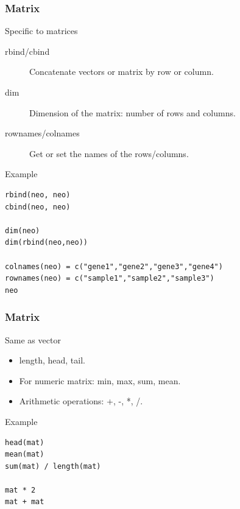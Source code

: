 \documentclass[10pt]{beamer}
\newenvironment{xframe}[2][]
  {\begin{frame}[fragile,environment=xframe,#1]
  \frametitle{#2}}
  {\end{frame}}
\begin{document}

\begin{xframe}{Matrix}
  \begin{block}{Specific to matrices}
    \begin{description}
    \item[rbind/cbind] Concatenate vectors or matrix by row or column.
    \item[dim] Dimension of the matrix: number of rows and columns.
    \item[rownames/colnames] Get or set the names of the rows/columns.
    \end{description}    
  \end{block}
  \begin{exampleblock}{Example}
\begin{verbatim}
rbind(neo, neo)
cbind(neo, neo)

dim(neo)
dim(rbind(neo,neo))

colnames(neo) = c("gene1","gene2","gene3","gene4")
rownames(neo) = c("sample1","sample2","sample3")
neo
\end{verbatim}
  \end{exampleblock}
\end{xframe}


\begin{xframe}{Matrix}
  \begin{block}{Same as {\sf vector}}
    \begin{itemize}
    \item {\sf length}, {\sf head}, {\sf tail}.
    \item For numeric matrix: {\sf min}, {\sf max}, {\sf sum}, {\sf mean}.
    \item Arithmetic operations: +, -, *, /.
    \end{itemize}
  \end{block}
  \begin{exampleblock}{Example}
\begin{verbatim}
head(mat)
mean(mat)
sum(mat) / length(mat)

mat * 2
mat + mat
\end{verbatim}
  \end{exampleblock}
\end{xframe}
\end{document}
